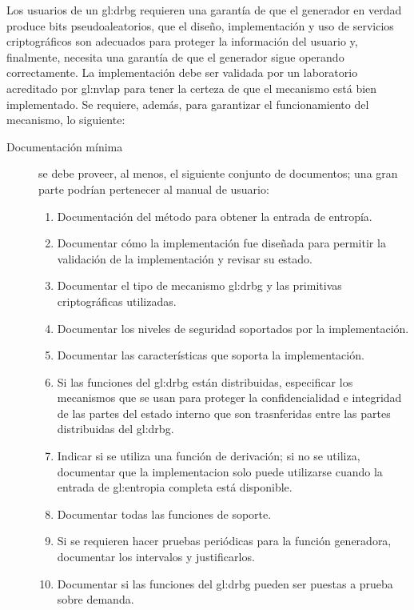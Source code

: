 %
%

Los usuarios de un \gls{gl:drbg} requieren una garantía de que el generador
en verdad produce bits pseudoaleatorios, que el diseño, implementación y uso
de servicios criptográficos son adecuados para proteger la información del
usuario y, finalmente, necesita una garantía de que el generador sigue
operando correctamente. La implementación debe ser validada por un laboratorio
acreditado por \gls{gl:nvlap} para tener la certeza de que el mecanismo está
bien implementado. Se requiere, además, para garantizar el funcionamiento del
mecanismo, lo siguiente:
\begin{description}
  \item[Documentación mínima] se debe proveer, al menos, el siguiente conjunto
    de documentos; una gran parte podrían pertenecer al manual de usuario:
    \begin{enumerate}
      \item Documentación del método para obtener la entrada de entropía.
      \item Documentar cómo la implementación fue diseñada para permitir la
        validación de la implementación y revisar su estado.
      \item Documentar el tipo de mecanismo \gls{gl:drbg} y las primitivas
        criptográficas utilizadas.
      \item Documentar los niveles de seguridad soportados por la
        implementación.
      \item Documentar las características que soporta la implementación.
      \item Si las funciones del \gls{gl:drbg} están distribuidas, especificar
        los mecanismos que se usan para proteger la confidencialidad e
        integridad de las partes del estado interno que son trasnferidas entre
        las partes distribuidas del \gls{gl:drbg}.
      \item Indicar si se utiliza una función de derivación; si no se utiliza,
        documentar que la implementacion solo puede utilizarse cuando la entrada
        de \gls{gl:entropia} completa está disponible.
      \item Documentar todas las funciones de soporte.
      \item Si se requieren hacer pruebas periódicas para la función generadora,
        documentar los intervalos y justificarlos.
      \item Documentar si las funciones del \gls{gl:drbg} pueden ser puestas a
        prueba sobre demanda.
    \end{enumerate}


\end{description}
